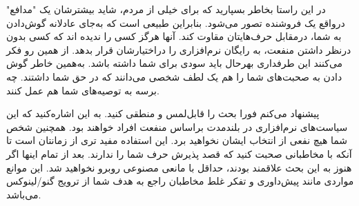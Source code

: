در این راستا بخاطر بسپارید که برای خیلی از مردم، شاید بیشترشان
یک "مدافع" درواقع یک فروشنده تصور می‌شود. بنابراین طبیعی است
که به‌جای عادلانه گوش‌دادن به شما، درمقابل حرف‌هایتان مقاوت کند.
آنها هرگز کسی را ندیده اند که کسی بدون درنظر داشتن منفعت، به رایگان
نرم‌افزاری را دراختیارشان قرار بدهد. از همین رو فکر می‌کنند این طرفداری
بهرحال باید سودی برای شما داشته باشد. به‌همین خاطر گوش دادن به صحبت‌های
شما را هم یک لطف شخصی می‌دانند که در حق شما داشتند. چه برسه به توصیه‌های
شما هم عمل کنند.

پیشنهاد می‌کنم فورا بحث را قابل‌لمس و منطقی کنید. به این اشاره‌کنید
که این سیاست‌های نرم‌افزاری در بلندمدت براساس منفعت افراد خواهند بود.
همچنین شخص شما هیچ نفعی از انتخاب ایشان نخواهید برد. این استفاده
مفید تری از زمانتان است تا آنکه با مخاطبانی صحبت کنید که قصد پذیرش
حرف شما را ندارند. بعد از تمام اینها اگر هنوز به این بحث علاقمند بودند،
حداقل با مانعی مصنوعی روبرو نخواهید شد. این موانع مواردی مانند پیش‌داوری
و تفکر غلط مخاطبان راجع به هدف شما از ترویج گنو/لینوکس می‌باشد.

